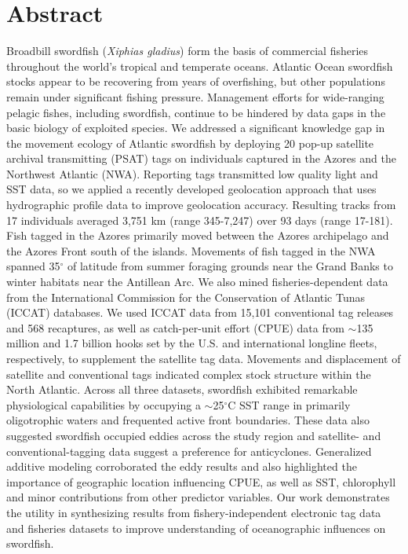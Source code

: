 \clearpage

\section{Abstract} 

Broadbill swordfish (\textit{Xiphias gladius}) form the basis of commercial fisheries throughout the world's tropical and temperate oceans. Atlantic Ocean swordfish stocks appear to be recovering from years of overfishing, but other populations remain under significant fishing pressure. Management efforts for wide-ranging pelagic fishes, including swordfish, continue to be hindered by data gaps in the basic biology of exploited species. We addressed a significant knowledge gap in the movement ecology of Atlantic swordfish by deploying 20 pop-up satellite archival transmitting (PSAT) tags on individuals captured in the Azores and the Northwest Atlantic (NWA). Reporting tags transmitted low quality light and SST data, so we applied a recently developed geolocation approach that uses hydrographic profile data to improve geolocation accuracy. Resulting tracks from 17 individuals averaged 3,751 km (range 345-7,247) over 93 days (range 17-181). Fish tagged in the Azores primarily moved between the Azores archipelago and the Azores Front south of the islands. Movements of fish tagged in the NWA spanned 35$^\circ$ of latitude from summer foraging grounds near the Grand Banks to winter habitats near the Antillean Arc. We also mined fisheries-dependent data from the International Commission for the Conservation of Atlantic Tunas (ICCAT) databases. We used ICCAT data from 15,101 conventional tag releases and 568 recaptures, as well as catch-per-unit effort (CPUE) data from $\sim$135 million and 1.7 billion hooks set by the U.S. and international longline fleets, respectively, to supplement the satellite tag data. Movements and displacement of satellite and conventional tags indicated complex stock structure within the North Atlantic. Across all three datasets, swordfish exhibited remarkable physiological capabilities by occupying a $\sim$25$^\circ$C SST range in primarily oligotrophic waters and frequented active front boundaries. These data also suggested swordfish occupied eddies across the study region and satellite- and conventional-tagging data suggest a preference for anticyclones. Generalized additive modeling corroborated the eddy results and also highlighted the importance of geographic location influencing CPUE, as well as SST, chlorophyll and minor contributions from other predictor variables. Our work demonstrates the utility in synthesizing results from fishery-independent electronic tag data and fisheries datasets to improve understanding of oceanographic influences on swordfish.

